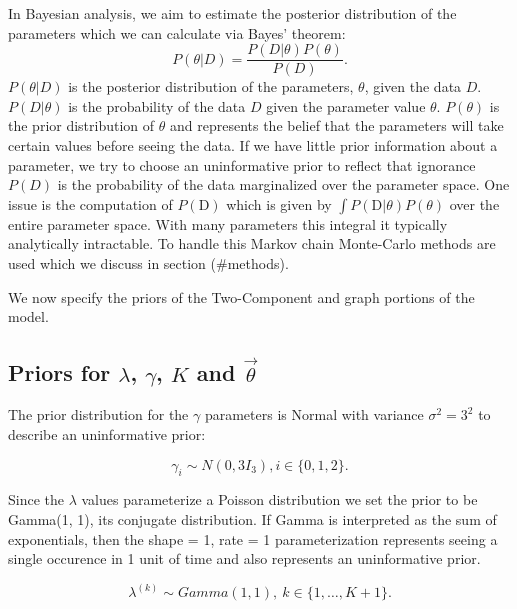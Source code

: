 \documentclass[11pt,a4paper]{article}
\numberwithin{equation}{section}
\begin{document}
In Bayesian analysis, we aim to estimate the posterior distribution of
the parameters which we can calculate via Bayes' theorem:
\[ P(\theta|D) = \frac{P(D|\theta)P(\theta)}{P(D)}.\] \(P(\theta|D)\) is
the posterior distribution of the parameters, \(\theta\), given the data
\(D\). \(P(D|\theta)\) is the probability of the data \(D\) given the
parameter value \(\theta\). \(P(\theta)\) is the prior distribution of
\(\theta\) and represents the belief that the parameters will take
certain values before seeing the data. If we have little prior
information about a parameter, we try to choose an uninformative prior
to reflect that ignorance \(P(D)\) is the probability of the data
marginalized over the parameter space. One issue is the computation of
\(P(\text{D})\) which is given by \(\int P(\text{D}|\theta)P(\theta)\)
over the entire parameter space. With many parameters this integral it
typically analytically intractable. To handle this Markov chain
Monte-Carlo methods are used which we discuss in section (\#methods).

We now specify the priors of the Two-Component and graph portions of the
model.

\hypertarget{priors-for-lambda-gamma-k-and-vectheta}{%
\subsection{\texorpdfstring{Priors for \(\lambda\), \(\gamma\), \(K\)
and
\(\vec{\theta}\)}{Priors for \textbackslash{}lambda, \textbackslash{}gamma, K and \textbackslash{}vec\{\textbackslash{}theta\}}}\label{priors-for-lambda-gamma-k-and-vectheta}}

The prior distribution for the \(\gamma\) parameters is Normal with
variance \(\sigma^2 = 3^2\) to describe an uninformative prior:

\[\gamma_i \sim N(0, 3I_3), i \in \{0,1,2\}.\]

Since the \(\lambda\) values parameterize a Poisson distribution we set
the prior to be Gamma(1, 1), its conjugate distribution. If Gamma is
interpreted as the sum of exponentials, then the shape = 1, rate = 1
parameterization represents seeing a single occurence in 1 unit of time
and also represents an uninformative prior.

\[ \lambda^{(k)} \sim Gamma(1, 1),\ k \in \{1, \dots, K + 1\}.\]
\end{document}
